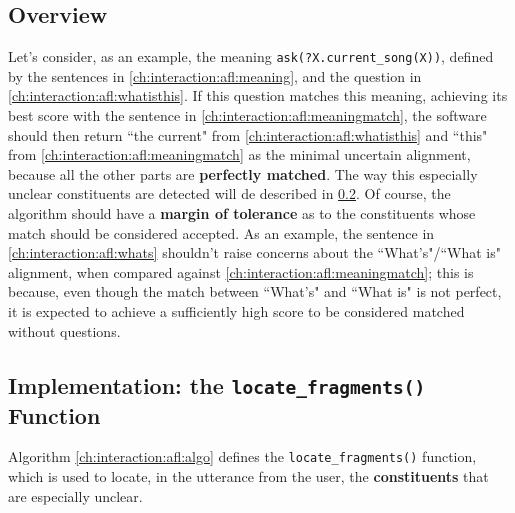 \subsection{Overview}
Let's consider, as an example, the meaning \texttt{ask(?X.current\_song(X))}, defined by the sentences in \ref{ch:interaction:afl:meaning}, and the question in \ref{ch:interaction:afl:whatisthis}. If this question matches this meaning, achieving its best score with the sentence in  \ref{ch:interaction:afl:meaningmatch}, the software should then return ``the current" from \ref{ch:interaction:afl:whatisthis} and ``this" from \ref{ch:interaction:afl:meaningmatch} as the minimal uncertain alignment, because all the other parts are \textbf{perfectly matched}. The way this especially unclear constituents are detected will de described in \ref{ch:interaction:afl:impl}.
 \label{ch:interaction:afl:meaning}
\vspace{-0.5cm} %
Of course, the algorithm should have a \textbf{margin of tolerance} as to the constituents whose match should be considered accepted. As an example, the sentence in \ref{ch:interaction:afl:whats} shouldn't raise concerns about the ``What's"/``What is" alignment, when compared against \ref{ch:interaction:afl:meaningmatch}; this is because, even though the match between ``What's" and ``What is" is not perfect, it is expected to achieve a sufficiently high score to be considered matched without questions.


\subsection{Implementation: the \texttt{locate\_fragments()} Function} \label{ch:interaction:afl:impl}
Algorithm \ref{ch:interaction:afl:algo} defines the \texttt{locate\_fragments()} function, which is used to locate, in the utterance from the user, the \textbf{constituents} that are especially unclear.

